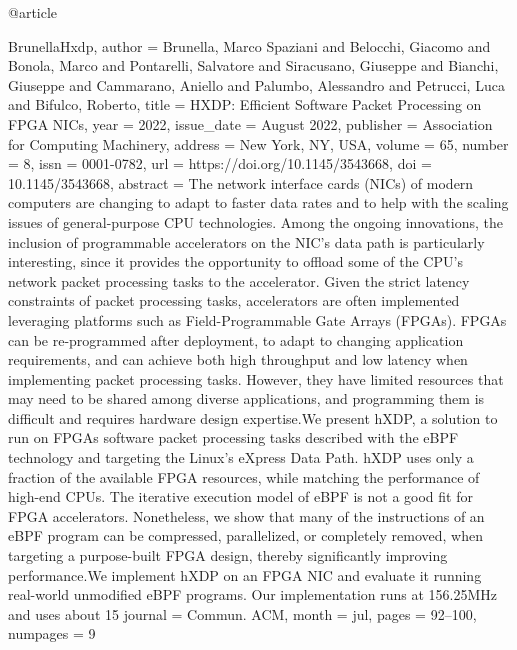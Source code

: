 @article{BrunellaHxdp,
author = {Brunella, Marco Spaziani and Belocchi, Giacomo and Bonola, Marco and Pontarelli, Salvatore and Siracusano, Giuseppe and Bianchi, Giuseppe and Cammarano, Aniello and Palumbo, Alessandro and Petrucci, Luca and Bifulco, Roberto},
title = {HXDP: Efficient Software Packet Processing on FPGA NICs},
year = {2022},
issue_date = {August 2022},
publisher = {Association for Computing Machinery},
address = {New York, NY, USA},
volume = {65},
number = {8},
issn = {0001-0782},
url = {https://doi.org/10.1145/3543668},
doi = {10.1145/3543668},
abstract = {The network interface cards (NICs) of modern computers are changing to adapt to faster data rates and to help with the scaling issues of general-purpose CPU technologies. Among the ongoing innovations, the inclusion of programmable accelerators on the NIC's data path is particularly interesting, since it provides the opportunity to offload some of the CPU's network packet processing tasks to the accelerator. Given the strict latency constraints of packet processing tasks, accelerators are often implemented leveraging platforms such as Field-Programmable Gate Arrays (FPGAs). FPGAs can be re-programmed after deployment, to adapt to changing application requirements, and can achieve both high throughput and low latency when implementing packet processing tasks. However, they have limited resources that may need to be shared among diverse applications, and programming them is difficult and requires hardware design expertise.We present hXDP, a solution to run on FPGAs software packet processing tasks described with the eBPF technology and targeting the Linux's eXpress Data Path. hXDP uses only a fraction of the available FPGA resources, while matching the performance of high-end CPUs. The iterative execution model of eBPF is not a good fit for FPGA accelerators. Nonetheless, we show that many of the instructions of an eBPF program can be compressed, parallelized, or completely removed, when targeting a purpose-built FPGA design, thereby significantly improving performance.We implement hXDP on an FPGA NIC and evaluate it running real-world unmodified eBPF programs. Our implementation runs at 156.25MHz and uses about 15%
journal = {Commun. ACM},
month = {jul},
pages = {92–100},
numpages = {9}
}

}
